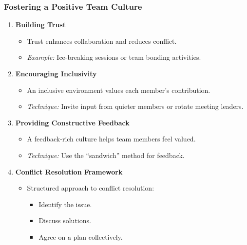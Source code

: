 \documentclass[aspectratio=169]{beamer}
\begin{document}
\begin{frame}[fragile]
    \frametitle{Fostering a Positive Team Culture}
    \begin{enumerate}
        \item \textbf{Building Trust}
            \begin{itemize}
                \item Trust enhances collaboration and reduces conflict.
                \item \textit{Example:} Ice-breaking sessions or team bonding activities.
            \end{itemize}

        \item \textbf{Encouraging Inclusivity}
            \begin{itemize}
                \item An inclusive environment values each member’s contribution.
                \item \textit{Technique:} Invite input from quieter members or rotate meeting leaders.
            \end{itemize}

        \item \textbf{Providing Constructive Feedback}
            \begin{itemize}
                \item A feedback-rich culture helps team members feel valued.
                \item \textit{Technique:} Use the “sandwich” method for feedback.
            \end{itemize}

        \item \textbf{Conflict Resolution Framework}
            \begin{itemize}
                \item Structured approach to conflict resolution:
                \begin{itemize}
                    \item Identify the issue.
                    \item Discuss solutions.
                    \item Agree on a plan collectively.
                \end{itemize}
            \end{itemize}
    \end{enumerate}
\end{frame}
\end{document}
